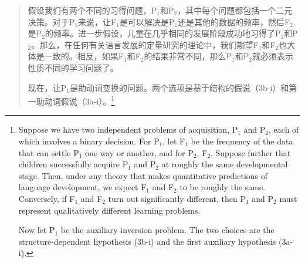\begin{quotation}
   假设我们有两个不同的习得问题，P$_1$和P$_2$，其中每个问题都包括一个二元决策。对于P$_1$来说，让F$_1$是可以解决是P$_1$还是其他的数据的频率，然后F$_2$是P$_2$的频率。进一步假设，儿童在几乎相同的发展阶段成功地习得了P$_1$和P$_2$。那么，在任何有关语言发展的定量研究的理论中，我们期望F$_1$和F$_2$也大体是一致的。相反，如果F$_1$和F$_2$的结果非常不同，那么P$_1$和P$_2$就必须表示性质不同的学习问题了。 

现在，让P$_1$是助动词变换的问题。两个选项是基于结构的假说（3b-i）和第一助动词假说（3a-i）。\citep[]{LY2002a}\footnote{%
   Suppose we have two independent problems of acquisition, P$_1$ and P$_2$, each
of which involves a binary decision. For P$_1$, let F$_1$ be the frequency of the
data that can settle P$_1$ one way or another, and for P$_2$, F$_2$. Suppose further
that children successfully acquire P$_1$ and P$_2$ at roughly the same developmental
stage. Then, under any theory that makes quantitative predictions of language
development, we expect F$_1$ and F$_2$ to be roughly the same. Conversely, if F$_1$ and
F$_2$ turn out significantly different, then P$_1$ and P$_2$ must represent qualitatively
different learning problems.

   Now let P$_1$ be the auxiliary inversion problem. The two choices are the
structure-dependent hypothesis (3b-i) and the first auxiliary hypothesis (3a-i). 
}
\end{quotation}

